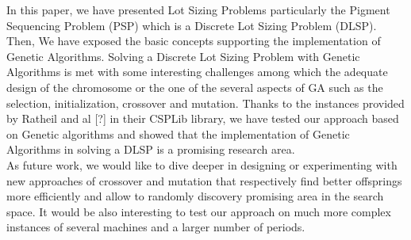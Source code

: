 \documentclass[twocolumn,10pt]{asme2ej}
\begin{document}
In this paper, we have presented Lot Sizing Problems particularly the Pigment Sequencing Problem (PSP) which is a Discrete Lot Sizing Problem (DLSP). Then, We have exposed the basic concepts supporting the implementation of Genetic Algorithms. Solving a Discrete Lot Sizing Problem with Genetic Algorithms is met with some interesting challenges among which the adequate design of the chromosome or the one of the several aspects of GA such as the selection, initialization, crossover and mutation. Thanks to the instances provided by Ratheil and al [?] in their CSPLib library, we have tested our approach based on Genetic algorithms and showed that the implementation of Genetic Algorithms in solving a DLSP is a promising research area. \\
As future work, we would like to dive deeper in designing or experimenting with new approaches of crossover and mutation that respectively find better offsprings more efficiently and allow to randomly discovery promising area in the search space. It would be also interesting to test our approach on much more complex instances of several machines and a larger number of periods. 


%




\end{document}
